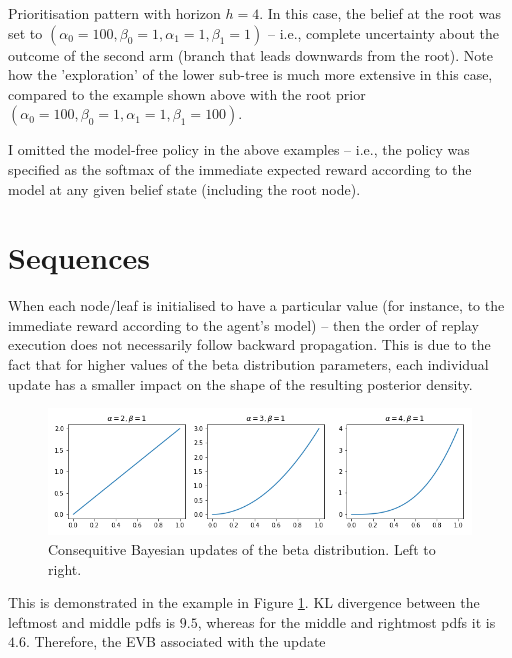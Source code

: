 \documentclass{article}
\begin{document}


\newpage
Prioritisation pattern with horizon $h=4$. In this case, the belief at the root was set to 
$(\alpha_0=100, \beta_0=1, \alpha_1=1, \beta_1=1)$ -- i.e., complete uncertainty about 
the outcome of the second arm (branch that leads downwards from the root). Note how the 
'exploration' of the lower sub-tree is much more extensive in this case, compared to the 
example shown above with the root prior $(\alpha_0=100, \beta_0=1, \alpha_1=1, \beta_1=100)$.
\vspace{1cm}



\newpage
I omitted the model-free policy in the above examples -- i.e., the policy was specified as the 
softmax of the immediate expected reward according to the model at any given belief state 
(including the root node). 

\section*{Sequences}
When each node/leaf is initialised to have a particular value (for instance, to the immediate 
reward according to the agent's model) -- then the order of replay execution does not necessarily 
follow backward propagation. This is due to the fact that for higher values of the beta distribution 
parameters, each individual update has a smaller impact on the shape of the resulting posterior density. 

\begin{figure}[h!]
    \centering
    \includegraphics[width=1\textwidth]{../Data/betas.png}
    \caption{Consequitive Bayesian updates of the beta distribution. Left to right.}
    \label{fig1}
\end{figure}

This is demonstrated in the example in Figure \ref{fig1}. KL divergence between the 
leftmost and middle pdfs is $9.5$, whereas for the middle and rightmost pdfs it is $4.6$.
Therefore, the EVB associated with the update 
\end{document}
